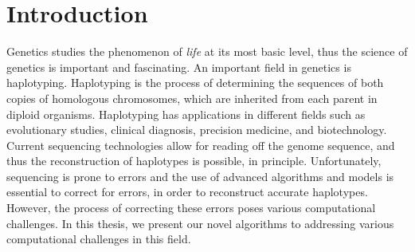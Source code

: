 \chapter{Introduction}\label{ref:chp1}



Genetics studies the phenomenon of \textit{life} at its most basic level, thus the science of genetics is important and fascinating.
An important field in genetics is haplotyping.
Haplotyping is the process of determining the sequences of both copies of homologous chromosomes, which are inherited from each parent in diploid organisms.
Haplotyping has applications in different fields such as evolutionary studies, clinical diagnosis, precision medicine, and biotechnology. 
Current sequencing technologies allow for reading off the genome sequence, and thus the reconstruction of haplotypes is
possible, in principle. Unfortunately, sequencing is prone to errors and the use of advanced algorithms and models is essential to correct for errors, in order to reconstruct accurate haplotypes.
However, the process of correcting these errors poses various computational challenges.
In this thesis, we present our novel algorithms to addressing various computational challenges in this field.

